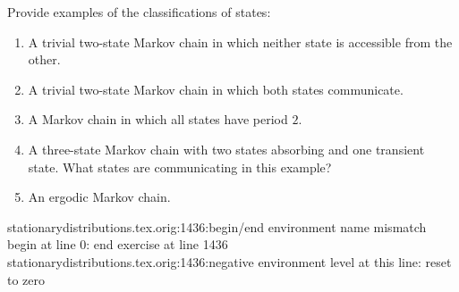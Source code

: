 \documentclass[12pt]{article}
\begin{document}
\begin{exercise}
    Provide examples of the classifications of states:
    \begin{enumerate}[label=(\alph*)]
    \item
        A trivial two-state Markov chain in which neither state is
        accessible from the other.
    \item
        A trivial two-state Markov chain in which both states
        communicate.
    \item
        A Markov chain in which all states have period \( 2 \).
    \item
        A three-state Markov chain with two states absorbing and one
        transient state.  What states are communicating in this example?
    \item
        An ergodic Markov chain.
\end{enumerate}
stationarydistributions.tex.orig:1436:begin/end environment name mismatch
	begin {} at line 0: end {exercise} at line 1436
stationarydistributions.tex.orig:1436:negative environment level at this line: reset to zero
\end{exercise}
\end{document}
